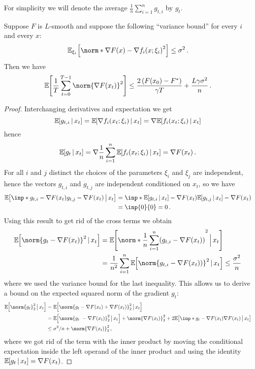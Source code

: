 \documentclass{article}
\begin{document}
For simplicity we will denote the average $\frac{1}{n} \sum_{i=1}^n g_{t,i}$ by $g_t$.


\begin{lemma}\label{lem:sgd-federated-convergence}
  Suppose $F$ is $L$-smooth and suppose the following ``variance bound'' for every $i$ and every $x$:
  \[
    \expec[\xi_i]{\norm*{ \nabla F(x) - \nabla f_i(x; \xi_i) }^2}
    \leq \sigma^2
    \, .
  \]
  Then we have
  \[
    \expec{\frac{1}{T} \sum_{t=0}^{T-1} \norm{\nabla F(x_t)}^2}
    \leq
    \frac{2\left(F(x_0) - F^\ast\right)}{\gamma T} + \frac{L \gamma \sigma^2}{n}
    \, .
  \]
\end{lemma}


\begin{proof}
  Interchanging derivatives and expectation we get
  \[
    \mathbb{\operatorname{\mathbb{E}}}_{\!\!}\left[g_{t,i} \,|\, x_t\right] = \mathbb{\operatorname{\mathbb{E}}}_{\!\!}\left[\nabla f_i(x_t; \xi_i) \,|\, x_t\right] = \nabla \mathbb{\operatorname{\mathbb{E}}}_{\!\!}\left[f_i(x_t; \xi_i) \,|\, x_t\right]
  \]
  hence
  \[
    \mathbb{\operatorname{\mathbb{E}}}_{\!\!}\left[g_t \,|\, x_t\right]
    =
    \nabla \frac{1}{n} \sum_{i=1}^n \mathbb{\operatorname{\mathbb{E}}}_{\!\!}\left[f_i(x_t; \xi_i) \,|\, x_t\right]
    =
    \nabla F(x_t)
    \, .
  \]
  For all $i$ and $j$ distinct the choices of the parameters $\xi_i$ and $\xi_j$ are independent, hence the vectors $g_{t,i}$ and $g_{t,j}$ are independent conditioned on $x_t$, so we have
  \begin{align*}
    \expec{\inp*{g_{t,i} - \nabla F(x_t)}{g_{t,j} - \nabla F(x_t)} \,\big|\, x_t}
     & =
    \inp*{\expec{g_{t,i} \,|\, x_t} - \nabla F(x_t)}{\expec{g_{t,j} \,|\, x_t} - \nabla F(x_t)}
    \\
     & =
    \inp{0}{0}
    =
    0 \, .
  \end{align*}
  Using this result to get rid of the cross terms we obtain
  \begin{align*}
    \expec{\norm{g_t - \nabla F(x_t)}^2 \,|\, x_t}
     & =
    \expec{\norm*{\frac{1}{n} \sum_{i=1}^n (g_{t,i} - \nabla F(x_t))}^2 \,\Big|\, x_t}
    \\
     & =
    \frac{1}{n^2} \sum_{i=1}^n \expec{\norm{g_{t,i} - \nabla F(x_t))}^2 \,|\, x_t}
    \leq
    \frac{\sigma^2}{n}
  \end{align*}
  where we used the variance bound for the last inequality. This allows us to derive a bound on the expected squared norm of the gradient $g_t$:
  \begin{align*}
    \expec{\norm{g_t}_2^2  \,\big|\, x_t}
     & =
    \expec{\norm{g_t - \nabla F(x_t) + \nabla F(x_t)}_2^2  \,\big|\, x_t}
    \\
     & =
    \expec{\norm{g_t\ - \nabla F(x_t)}_2^2  \,\big|\, x_t} + \norm{\nabla F(x_t)}_2^2 + 2 \expec{ \inp*{g_t - \nabla F(x_t)}{\nabla F(x_t)} \,\big|\, x_t}
    \\
     & \leq
    \sigma^2 / n + \norm{\nabla F(x_t)}_2^2
    \, ,
  \end{align*}
  where we got rid of the term with the inner product by moving the conditional expectation inside the left operand of the inner product and using the identity $\mathbb{\operatorname{\mathbb{E}}}_{\!\!}\left[g_t \,|\, x_t\right] = \nabla F(x_t)$.


\end{proof}
\end{document}
